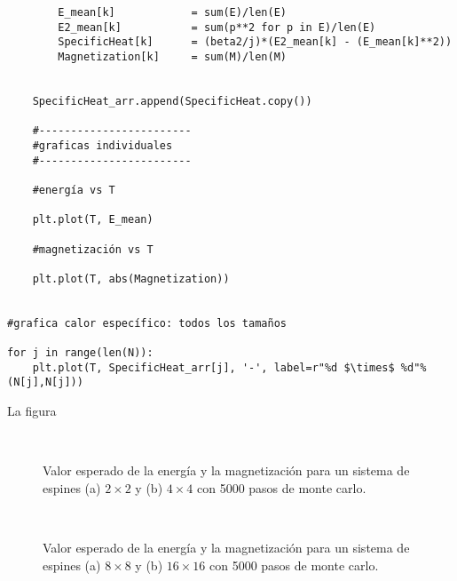 \documentclass[a4paper,12pt]{article}
\begin{document}
\begin{verbatim}
        E_mean[k]            = sum(E)/len(E)
        E2_mean[k]           = sum(p**2 for p in E)/len(E)
        SpecificHeat[k]      = (beta2/j)*(E2_mean[k] - (E_mean[k]**2)) 
        Magnetization[k]     = sum(M)/len(M)
        
           
    SpecificHeat_arr.append(SpecificHeat.copy())

    #------------------------
    #graficas individuales
    #------------------------
    
    #energía vs T    

    plt.plot(T, E_mean)
   
    #magnetización vs T

    plt.plot(T, abs(Magnetization))
    
 
#grafica calor específico: todos los tamaños

for j in range(len(N)):
    plt.plot(T, SpecificHeat_arr[j], '-', label=r"%d $\times$ %d"%(N[j],N[j]))

  \end{verbatim}
       
       \noindent La figura

       \begin{figure}[H]
         \centering
         \\
          \caption{Valor esperado de la energía y la magnetización para un sistema de espines (a) $2 \times 2$ y (b) $4 \times 4$ con 5000 pasos de monte carlo.}
         \label{fig:EM1}
       \end{figure}

       
       \begin{figure}[H]
         \centering
         \\
         \caption{Valor esperado de la energía y la magnetización para un sistema de espines (a) $8 \times 8$ y (b) $16 \times 16$ con 5000 pasos de monte carlo.}
         \label{fig:EM2}
       \end{figure}
\end{document}
